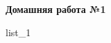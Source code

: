 \documentclass[12pt, a4paper]{article}
\begin{document}
	\begin{center}
		\large
		\textbf{Домашняя работа №1}
	\end{center}
	{list_1}
\end{document}
